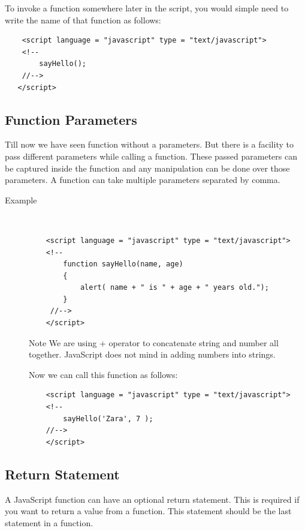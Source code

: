 \documentclass[11pt,a4paper]{article}
\begin{document}
To invoke a function somewhere later in the script, you would simple need to write the name of that function as follows:\\
\begin{verbatim}
    <script language = "javascript" type = "text/javascript">
    <!--
        sayHello();
    //-->
   </script>
\end{verbatim}

\subsection*{Function Parameters}

Till now we have seen function without a parameters. But there is a facility to pass different parameters while calling a function. These passed parameters can be captured inside the function and any manipulation can be done over those parameters. A function can take multiple parameters separated by comma.

\begin{description}
\item[Example]\

\begin{verbatim}
    <script language = "javascript" type = "text/javascript">
    <!--
        function sayHello(name, age)
        {
            alert( name + " is " + age + " years old.");
        }
     //-->
    </script>
\end{verbatim}

\begin{bclogo}[couleur=blue!5, arrondi=0.3, logo=\bctrombone]{Note}
We are using + operator to concatenate string and number all together. JavaScript does not mind in adding numbers into strings.
\end{bclogo}

Now we can call this function as follows:

\begin{verbatim}
    <script language = "javascript" type = "text/javascript">
    <!--
        sayHello('Zara', 7 );
    //-->
    </script>
\end{verbatim}
\end{description}

\subsection*{Return Statement}

A JavaScript function can have an optional return statement. This is required if you want to return a value from a function. This statement should be the last statement in a function.
\end{document}
